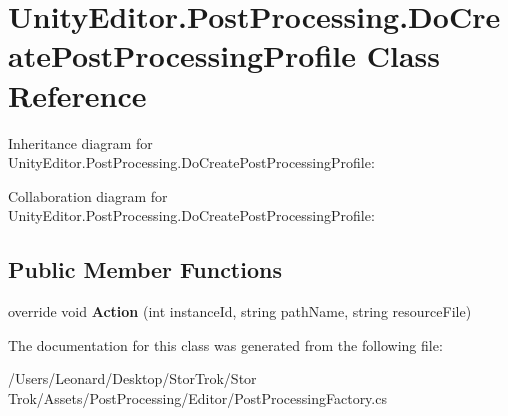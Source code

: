 \hypertarget{class_unity_editor_1_1_post_processing_1_1_do_create_post_processing_profile}{}\section{Unity\+Editor.\+Post\+Processing.\+Do\+Create\+Post\+Processing\+Profile Class Reference}
\label{class_unity_editor_1_1_post_processing_1_1_do_create_post_processing_profile}


Inheritance diagram for Unity\+Editor.\+Post\+Processing.\+Do\+Create\+Post\+Processing\+Profile\+:


Collaboration diagram for Unity\+Editor.\+Post\+Processing.\+Do\+Create\+Post\+Processing\+Profile\+:
\subsection*{Public Member Functions}
\begin{DoxyCompactItemize}
\item 
\mbox{\label{class_unity_editor_1_1_post_processing_1_1_do_create_post_processing_profile_ab5f81f0dce2a8bf886642315e22efd83}} 
override void {\bfseries Action} (int instance\+Id, string path\+Name, string resource\+File)
\end{DoxyCompactItemize}


The documentation for this class was generated from the following file\+:\begin{DoxyCompactItemize}
\item 
/\+Users/\+Leonard/\+Desktop/\+Stor\+Trok/\+Stor Trok/\+Assets/\+Post\+Processing/\+Editor/Post\+Processing\+Factory.\+cs\end{DoxyCompactItemize}
